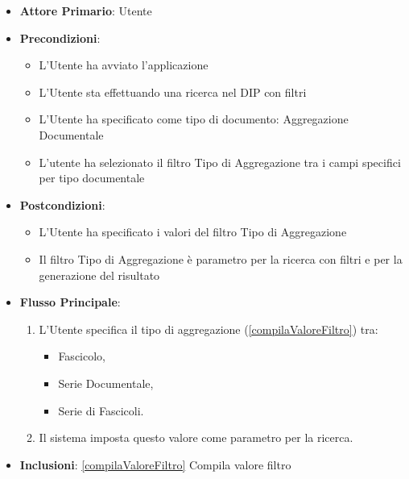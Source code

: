 \begin{itemize}
      \item \textbf{Attore Primario}: Utente
      \item \textbf{Precondizioni}: 
      \begin{itemize}
            \item L'Utente ha avviato l'applicazione
            \item L'Utente sta effettuando una ricerca nel DIP con filtri
            \item L'Utente ha specificato come tipo di documento: Aggregazione Documentale
            \item L'utente ha selezionato il filtro Tipo di Aggregazione tra i campi specifici per tipo documentale
      \end{itemize}
      \item \textbf{Postcondizioni}: 
      \begin{itemize}
            \item L'Utente ha specificato i valori del filtro Tipo di Aggregazione
            \item Il filtro Tipo di Aggregazione è parametro per la ricerca con filtri e per la generazione del risultato
      \end{itemize}
      \item \textbf{Flusso Principale}:
      \begin{enumerate}
            \item L'Utente specifica il tipo di aggregazione (\ref{compilaValoreFiltro}) tra:
            \begin{itemize}
                  \item Fascicolo,
                  \item Serie Documentale,
                  \item Serie di Fascicoli.
            \end{itemize}
            \item Il sistema imposta questo valore come parametro per la ricerca.
      \end{enumerate}
      \item \textbf{Inclusioni}: \ref{compilaValoreFiltro} Compila valore filtro
\end{itemize}

